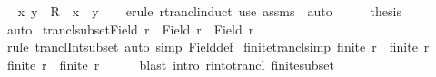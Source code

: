 \begin{isabellebody}
%
\isadelimproof
%
\endisadelimproof
%
\isatagproof
{}\isamarkupfalse%
\ {\isacharminus}{\kern0pt}\isanewline
{}\isamarkupfalse%
\ {\isachardoublequoteopen}{\isacharparenleft}{\kern0pt}x{\isacharcomma}{\kern0pt}\ y{\isacharparenright}{\kern0pt}\ {\isasymin}\ R\isactrlsup {\isacharasterisk}{\kern0pt}\ {\isasymLongrightarrow}\ x\ {\isacharequal}{\kern0pt}\ y{\isachardoublequoteclose}\isanewline
\ \ \isamarkupfalse%
\ {\isacharparenleft}{\kern0pt}erule\ rtrancl{\isacharunderscore}{\kern0pt}induct{\isacharparenright}{\kern0pt}\ {\isacharparenleft}{\kern0pt}use\ assms\ \ auto{\isacharparenright}{\kern0pt}\isanewline
\ \ \isamarkupfalse%
\ \isamarkupfalse%
\ {\isacharquery}{\kern0pt}thesis\isanewline
\ \ \ \ \isamarkupfalse%
\ auto\isanewline
{}\isamarkupfalse%
%
\endisatagproof
{\isafoldproof}%
%
\isadelimproof
\isanewline
%
\endisadelimproof
\isanewline
{}\isamarkupfalse%
\ trancl{\isacharunderscore}{\kern0pt}subset{\isacharunderscore}{\kern0pt}Field{}{\isacharcolon}{\kern0pt}\ {\isachardoublequoteopen}r\isactrlsup {\isacharplus}{\kern0pt}\ {\isasymsubseteq}\ Field\ r\ {\isasymtimes}\ Field\ r{\isachardoublequoteclose}\isanewline
%
\isadelimproof
\ \ %
\endisadelimproof
%
\isatagproof
{}\isamarkupfalse%
\ {\isacharparenleft}{\kern0pt}rule\ trancl{\isacharunderscore}{\kern0pt}Int{\isacharunderscore}{\kern0pt}subset{\isacharparenright}{\kern0pt}\ {\isacharparenleft}{\kern0pt}auto\ simp{\isacharcolon}{\kern0pt}\ Field{\isacharunderscore}{\kern0pt}def{\isacharparenright}{\kern0pt}%
\endisatagproof
{\isafoldproof}%
%
\isadelimproof
\isanewline
%
\endisadelimproof
\isanewline
{}\isamarkupfalse%
\ finite{\isacharunderscore}{\kern0pt}trancl{\isacharbrackleft}{\kern0pt}simp{\isacharbrackright}{\kern0pt}{\isacharcolon}{\kern0pt}\ {\isachardoublequoteopen}finite\ {\isacharparenleft}{\kern0pt}r\isactrlsup {\isacharplus}{\kern0pt}{\isacharparenright}{\kern0pt}\ {\isacharequal}{\kern0pt}\ finite\ r{\isachardoublequoteclose}\isanewline
%
\isadelimproof
%
\endisadelimproof
%
\isatagproof
{}\isamarkupfalse%
\isanewline
\ \ \isamarkupfalse%
\ {\isachardoublequoteopen}finite\ {\isacharparenleft}{\kern0pt}r\isactrlsup {\isacharplus}{\kern0pt}{\isacharparenright}{\kern0pt}\ {\isasymLongrightarrow}\ finite\ r{\isachardoublequoteclose}\isanewline
\ \ \ \ \isamarkupfalse%
\ {\isacharparenleft}{\kern0pt}blast\ intro{\isacharcolon}{\kern0pt}\ r{\isacharunderscore}{\kern0pt}into{\isacharunderscore}{\kern0pt}trancl{\isacharprime}{\kern0pt}\ finite{\isacharunderscore}{\kern0pt}subset{\isacharparenright}{\kern0pt}\isanewline

\end{isabellebody}
